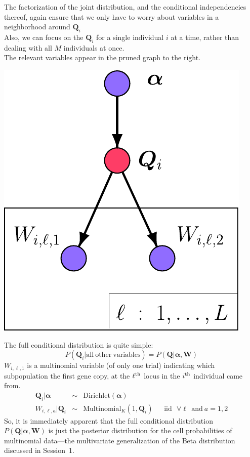 \begin{minipage}{.47\textwidth}
The factorization of the joint distribution, and the conditional independencies thereof, again ensure that we only have to worry about variables in a neighborhood around $\bm{Q}_i$\\

Also, we can focus on the $\bm{Q}_i$ for a single individual $i$ at a time, rather than dealing with all $M$ individuals at once.  \\


The relevant variables appear in the pruned graph to the right.
\end{minipage}
\hfill
\begin{minipage}{.51\textwidth}
\vfill
\begin{center}
\hfill\includegraphics*[width=.75\textwidth]{illus/PritchSimple2_purpQprune.pdf}
\end{center}
\vfill
\end{minipage}

\newpage
The full conditional distribution is quite simple:
\[
P(\bm{Q}_i|\mathrm{all~other~variables}) = P(\bm{Q}|\bm{\alpha}, \bm{W})
\] 
$W_{i,\ell,1}$ is a multinomial variable (of only one trial) indicating which subpopulation the first gene copy, at the $\ell^\mathrm{th}$ locus in the $i^\mathrm{th}$ individual came from.
\begin{eqnarray*}
\bm{Q}_i | \bm{\alpha} &\sim& \mathrm{Dirichlet}(\bm{\alpha}) \\
W_{i,\ell,a} | \bm{Q}_i  &\sim&  \mathrm{Multinomial}_K(1,\bm{Q}_i)~~~~~~~\mathrm{iid}~~~\forall \ell~~\mathrm{and}~a=1,2
\end{eqnarray*}
So, it is immediately apparent that the full conditional distribution \\
$P(\bm{Q}|\bm{\alpha}, \bm{W})$ is just the posterior distribution for the cell probabilities of multinomial data---the multivariate generalization of the Beta distribution discussed in Session~1.

